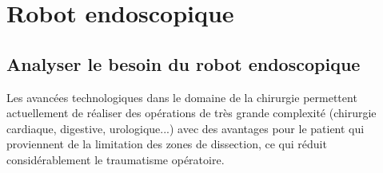 \documentclass[10pt,fleqn]{article} %
\begin{document}
%
%
%

%
%




\section{Robot endoscopique}%

\subsection{Analyser le besoin du robot endoscopique\\}
Les avancées technologiques dans le domaine de la chirurgie permettent actuellement
de réaliser des opérations de très grande complexité (chirurgie cardiaque,
digestive, urologique...) avec des avantages pour le patient qui proviennent de la limitation
des zones de dissection, ce qui réduit considérablement le traumatisme
opératoire.
\end{document}
